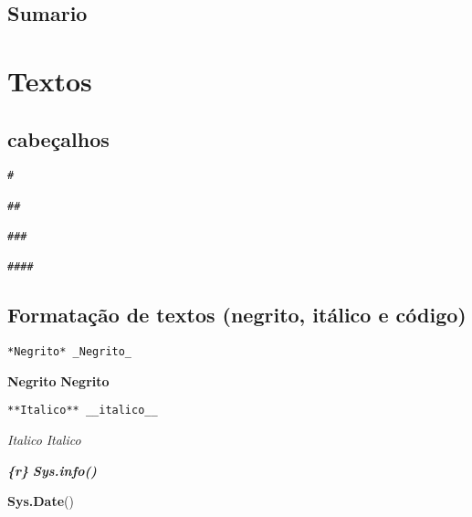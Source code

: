 \documentclass[
]{book}
\newenvironment{Shaded}{\begin{snugshade}}{\end{snugshade}}
\newcommand{\InformationTok}[1]{\textcolor[rgb]{0.56,0.35,0.01}{\textbf{\textit{#1}}}}
\newcommand{\KeywordTok}[1]{\textcolor[rgb]{0.13,0.29,0.53}{\textbf{#1}}}
\newcommand{\NormalTok}[1]{#1}
\begin{document}
\hypertarget{sumario}{%
\subsection{Sumario}\label{sumario}}

\hypertarget{textos}{%
\section{Textos}\label{textos}}

\hypertarget{cabeuxe7alhos}{%
\subsection{cabeçalhos}\label{cabeuxe7alhos}}

\begin{verbatim}
#

##

###

####
\end{verbatim}

\hypertarget{formatauxe7uxe3o-de-textos-negrito-ituxe1lico-e-cuxf3digo}{%
\subsection{Formatação de textos (negrito, itálico e código)}\label{formatauxe7uxe3o-de-textos-negrito-ituxe1lico-e-cuxf3digo}}

\begin{verbatim}
*Negrito* _Negrito_
\end{verbatim}

\textbf{Negrito} \textbf{Negrito}

\begin{verbatim}
**Italico** __italico__
\end{verbatim}

\emph{Italico} \emph{Italico}

\begin{Shaded}
\begin{Highlighting}[]
\InformationTok{\textasciigrave{}\textasciigrave{}\textasciigrave{}\{r\}}
\InformationTok{Sys.info()}
\InformationTok{\textasciigrave{}\textasciigrave{}\textasciigrave{}}
\end{Highlighting}
\end{Shaded}

\begin{Shaded}
\begin{Highlighting}[]
\KeywordTok{Sys.Date}\NormalTok{()}
\end{Highlighting}
\end{Shaded}
\end{document}
